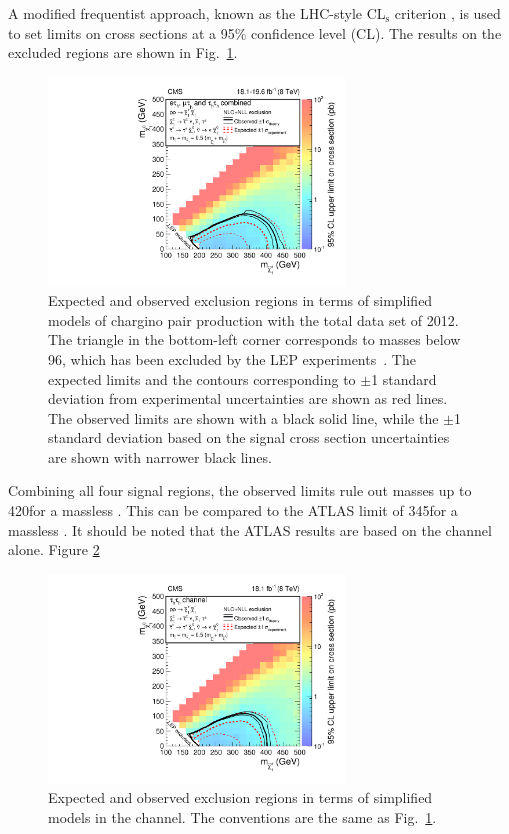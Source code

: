 A modified frequentist approach, known as the LHC-style CL$_\mathrm{s}$ criterion \cite{read:CLs,Junk:1999kv,ATLAS:2011tau}, is used to
set limits on cross sections at a 95\% confidence level (CL).
The results on the excluded regions are shown in Fig.~\ref{fig:limit_final}.
\begin{linenomath}
\begin{figure}[!htb]
\centering
\includegraphics[width=0.7\textwidth,keepaspectratio=true]{Figure_005.pdf}
\caption{Expected and observed exclusion regions in terms of simplified models of
chargino pair production with the total data set of 2012.
The triangle in the bottom-left corner corresponds to  \PSGt masses below 96\GeV, which has been excluded by the LEP experiments~\cite{lepsusy}.
The expected limits and the contours corresponding to $\pm$1 standard deviation from experimental uncertainties are shown as red lines.
The observed limits are shown with a black solid line, while the $\pm$1 standard deviation based on the signal cross section uncertainties
are shown with narrower black lines.}
\label{fig:limit_final}
\end{figure}
\end{linenomath}
Combining all four signal regions,
the observed limits rule out \PSGcpmDo  masses up to  420\GeV  for a massless \PSGczDo.
This can be compared to the ATLAS limit of 345\GeV for a massless \PSGczDo \cite{Aad:2014yka}.
It should be noted that the ATLAS results are based on the \tauTau channel alone. Figure
\ref{fig:limit_tauTau}
\begin{linenomath}
\begin{figure}[!htb]
\centering
\includegraphics[width=0.7\textwidth,keepaspectratio=true]{Figure_006.pdf}
\caption{Expected and observed exclusion regions in terms of simplified models
in the \tauTau channel. The conventions are the same as Fig.~\ref{fig:limit_final}.}
\label{fig:limit_tauTau}
\end{figure}
\end{linenomath}
